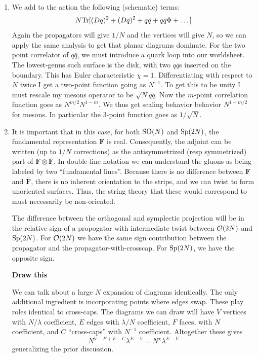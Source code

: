 \documentclass[11pt, class=article, crop=false]{standalone}
\begin{document}
\begin{enumerate}
	\item We add to the action the following (schematic) terms:
	\[
		N \mathrm{Tr}[(D q)^2 + (D \bar q)^2 + q \bar q + q \bar q \Phi + \dots ]
	\]
	Again the propagators will give $1/N$ and the vertices will give $N$, so we can apply the same analysis to get that planar diagrams dominate. For the two point correlator of $q \bar q$, we must introduce a quark loop into our worldsheet. The lowest-genus such surface is the disk, with two $q \bar q$s inserted on the boundary. This has Euler characteristic $\chi = 1$. Differentiating with respect to $N$ twice I get a two-point function going as $N^{-1}$. To get this to be unity I must rescale my mesons operator to be $\sqrt{N} q \bar q$. Now the $m$-point correlation function goes as $N^{m/2} N^{1-m}$.
	We thus get scaling behavior behavior $N^{1-m/2}$ for mesons. In particular the 3-point function goes as $1/\sqrt{N}$. 
	
	
	\item It is important that in this case, for both $\mathrm{SO}(N)$ and $\mathrm{Sp}(2N)$, the fundamental representation $\mathbf{F}$ is real. Consequently, the adjoint can be written (up to $1/N$ corrections) as the antisymmetrized (resp symmetrized) part of $\mathbf{F} \otimes \mathbf{F}$. In double-line notation we can understand the gluons as being labeled by two ``fundamental lines''. Because there is no difference between $\mathbf{F}$ and $\overline{\mathbf{F}}$, there is no inherent orientation to the strips, and we can twist to form unoriented surfaces. Thus, the string theory that these would correspond to must necessarily be non-oriented. 
	
	The difference between the orthogonal and symplectic projection will be in the relative sign of a propogator with intermediate twist between $\mathcal{O}(2N)$ and $\mathrm{Sp}(2N)$. For $\mathcal{O}(2N)$ we have the same sign contribution between the propagator and the propagator-with-crosscap. For $\mathrm{Sp}(2N)$, we have the opposite sign.
	
	\textbf{Draw this}
	
	We can talk about a large $N$ expansion of diagrams identically. The only additional ingredient is incorporating points where edges swap. These play roles identical to cross-caps. The diagrams we can draw will have $V$ vertices with $N/\lambda$ coefficient, $E$ edges with $\lambda/N$ coefficient, $F$ faces, with $N$ coefficient, and $C$ ``cross-caps'' with $N^{-1}$ coefficient. Altogether these gives 
	\[
		N^{V-E+F-C} \lambda^{E-V} = N^{\chi} \lambda^{E-V}
	\]
	generalizing the prior discussion.
	

\end{enumerate}
\end{document}
